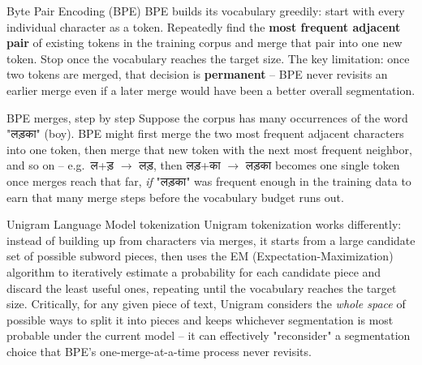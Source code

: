 \documentclass[11pt]{report}
\newcommand{\dn}[1]{{\devanagarifont #1}}
\begin{document}
\begin{concept}{Byte Pair Encoding (BPE)}
BPE builds its vocabulary greedily: start with every individual character
as a token. Repeatedly find the \textbf{most frequent adjacent pair} of
existing tokens in the training corpus and merge that pair into one new
token. Stop once the vocabulary reaches the target size. The key
limitation: once two tokens are merged, that decision is
\textbf{permanent} -- BPE never revisits an earlier merge even if a
later merge would have been a better overall segmentation.
\end{concept}

\begin{example}{BPE merges, step by step}
Suppose the corpus has many occurrences of the word \dn{"लड़का"} (boy). BPE
might first merge the two most frequent adjacent characters into one
token, then merge that new token with the next most frequent neighbor,
and so on -- e.g.\ \dn{ल}+\dn{ड़} $\rightarrow$ \dn{लड़}, then
\dn{लड़}+\dn{का} $\rightarrow$ \dn{लड़का} becomes one single token once
merges reach that far, \textit{if} \dn{"लड़का"} was frequent enough in the
training data to earn that many merge steps before the vocabulary budget
runs out.
\end{example}

\begin{concept}{Unigram Language Model tokenization}
Unigram tokenization works differently: instead of building up from
characters via merges, it starts from a large candidate set of possible
subword pieces, then uses the EM (Expectation-Maximization) algorithm to
iteratively estimate a probability for each candidate piece and discard
the least useful ones, repeating until the vocabulary reaches the target
size. Critically, for any given piece of text, Unigram considers the
\textit{whole space} of possible ways to split it into pieces and keeps
whichever segmentation is most probable under the current model -- it
can effectively "reconsider" a segmentation choice that BPE's
one-merge-at-a-time process never revisits.
\end{concept}
\end{document}
